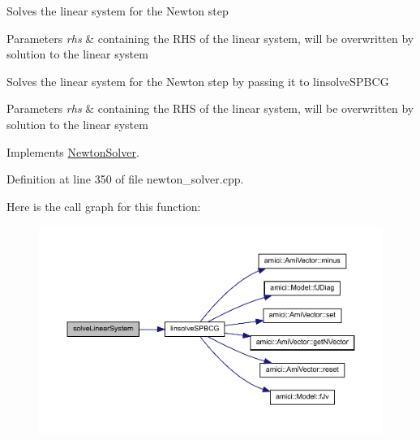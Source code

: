 Solves the linear system for the Newton step


\begin{DoxyParams}{Parameters}
{\em rhs} & containing the R\+HS of the linear system, will be overwritten by solution to the linear system \\
\hline
\end{DoxyParams}
Solves the linear system for the Newton step by passing it to linsolve\+S\+P\+B\+CG


\begin{DoxyParams}{Parameters}
{\em rhs} & containing the R\+HS of the linear system, will be overwritten by solution to the linear system\\
\hline
\end{DoxyParams}


Implements \mbox{\hyperlink{classamici_1_1_newton_solver_a761a5dc9e8cc7adfd4a392421df17c3d}{Newton\+Solver}}.



Definition at line 350 of file newton\+\_\+solver.\+cpp.

Here is the call graph for this function\+:
\nopagebreak
\begin{figure}[H]
\begin{center}
\leavevmode
\includegraphics[width=350pt]{classamici_1_1_newton_solver_iterative_aced8bda2d8b3051a8632152cb1f7da4a_cgraph}
\end{center}
\end{figure}
\mbox{\label{classamici_1_1_newton_solver_iterative_acb5ad8b8b0ff7ee8d963194ca8c8ed78}} 
